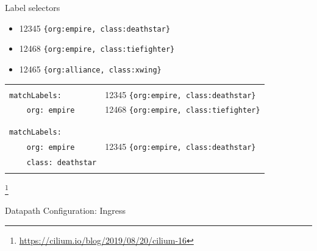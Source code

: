 \documentclass[black,white]{beamer}
\newcommand\blfootnote[1]{%
  \begingroup
  \renewcommand\thefootnote{}\footnote{#1}%
  \addtocounter{footnote}{-1}%
  \endgroup
}
\DeclareRobustCommand{\#}{\adjustbox{valign=B,totalheight=.57\baselineskip}{\oldhash}}%
\begin{document}
    \begin{frame}[fragile]{Label selectors}
        \vfill
        \begin{itemize}
            \item 12345 \verb+{org:empire, class:deathstar}+ \smallskip
            \item 12468 \verb+{org:empire, class:tiefighter}+ \smallskip
            \item 12465 \verb+{org:alliance, class:xwing}+ \smallskip
        \end{itemize}
        \vfill
        \begin{tabularx}{\textwidth}{l|l}
            \hline
            & \\
            \verb+matchLabels:+ & 12345 \verb+{org:empire, class:deathstar}+ \\
            \verb+    org: empire+ & 12468 \verb+{org:empire, class:tiefighter}+ \\
            & \\
            \hline
            & \\
            \verb+matchLabels:+ & \\
            \verb+    org: empire+ & 12345 \verb+{org:empire, class:deathstar}+ \\
            \verb+    class: deathstar+ & \\
            & \\
            \hline
        \end{tabularx}
        \vfill
        \blfootnote{\tiny \url{https://cilium.io/blog/2019/08/20/cilium-16}}
    \end{frame}

    \begin{frame}{Datapath Configuration: Ingress}
        \vfill
        \begin{figure}
            
        \end{figure}
        \vfill
    \end{frame}
\end{document}

